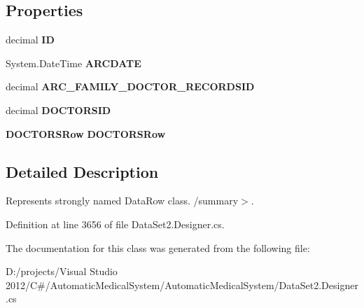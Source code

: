\subsection*{Properties}
\begin{CompactItemize}
\item 
decimal \textbf{ID}\hspace{0.3cm}{\tt  [get, set]}\label{class_automatic_medical_system_1_1_data_set2_1_1_a_r_c___s_p___d_o_c_t_o_r___r_e_c_o_r_d_s_row_c3446c30bba63ff2ff8e113bb249f3bf}

\item 
System.DateTime \textbf{ARCDATE}\hspace{0.3cm}{\tt  [get, set]}\label{class_automatic_medical_system_1_1_data_set2_1_1_a_r_c___s_p___d_o_c_t_o_r___r_e_c_o_r_d_s_row_a8223a06ae5d405349b92c5e529df840}

\item 
decimal \textbf{ARC\_\-FAMILY\_\-DOCTOR\_\-RECORDSID}\hspace{0.3cm}{\tt  [get, set]}\label{class_automatic_medical_system_1_1_data_set2_1_1_a_r_c___s_p___d_o_c_t_o_r___r_e_c_o_r_d_s_row_ac01df61f43db44091ade173c7911a31}

\item 
decimal \textbf{DOCTORSID}\hspace{0.3cm}{\tt  [get, set]}\label{class_automatic_medical_system_1_1_data_set2_1_1_a_r_c___s_p___d_o_c_t_o_r___r_e_c_o_r_d_s_row_02934ec3554937a5ad1c3f1aadb0350f}

\item 
{\bf DOCTORSRow} \textbf{DOCTORSRow}\hspace{0.3cm}{\tt  [get, set]}\label{class_automatic_medical_system_1_1_data_set2_1_1_a_r_c___s_p___d_o_c_t_o_r___r_e_c_o_r_d_s_row_4fdff51963c2c6d801500b729de5d7d7}

\end{CompactItemize}


\subsection{Detailed Description}
Represents strongly named DataRow class. /summary$>$. 

Definition at line 3656 of file DataSet2.Designer.cs.

The documentation for this class was generated from the following file:\begin{CompactItemize}
\item 
D:/projects/Visual Studio 2012/C\#/AutomaticMedicalSystem/AutomaticMedicalSystem/DataSet2.Designer.cs\end{CompactItemize}
